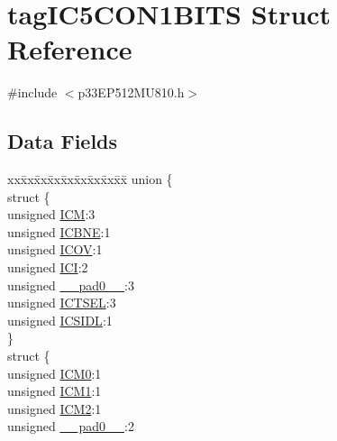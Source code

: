 \hypertarget{structtag_i_c5_c_o_n1_b_i_t_s}{}\section{tag\+I\+C5\+C\+O\+N1\+B\+I\+TS Struct Reference}
\label{structtag_i_c5_c_o_n1_b_i_t_s}


{\ttfamily \#include $<$p33\+E\+P512\+M\+U810.\+h$>$}

\subsection*{Data Fields}
\begin{DoxyCompactItemize}
\item 
\begin{tabbing}
xx\=xx\=xx\=xx\=xx\=xx\=xx\=xx\=xx\=\kill
union \{\\
\>struct \{\\
\>\>unsigned \hyperlink{structtag_i_c5_c_o_n1_b_i_t_s_ad3edde44ecb2d349ffa2decd0a251c20}{ICM}:3\\
\>\>unsigned \hyperlink{structtag_i_c5_c_o_n1_b_i_t_s_a824e7dcca83939e1b049d63ffcee33e9}{ICBNE}:1\\
\>\>unsigned \hyperlink{structtag_i_c5_c_o_n1_b_i_t_s_a49392949376ba0bf58cf8db889e86c94}{ICOV}:1\\
\>\>unsigned \hyperlink{structtag_i_c5_c_o_n1_b_i_t_s_a72486dcb868aad2d5c978494691356cc}{ICI}:2\\
\>\>unsigned \hyperlink{structtag_i_c5_c_o_n1_b_i_t_s_adf71f3d8410c1f1dbbc96680a92c49af}{\_\_pad0\_\_}:3\\
\>\>unsigned \hyperlink{structtag_i_c5_c_o_n1_b_i_t_s_a7a9dd41b5f93eb620df7fa336e452677}{ICTSEL}:3\\
\>\>unsigned \hyperlink{structtag_i_c5_c_o_n1_b_i_t_s_af441b36127c0bb7a35162dfc9a64103c}{ICSIDL}:1\\
\>\} \\
\>struct \{\\
\>\>unsigned \hyperlink{structtag_i_c5_c_o_n1_b_i_t_s_a649b1dd9bca75e558f37a9f52a829bd4}{ICM0}:1\\
\>\>unsigned \hyperlink{structtag_i_c5_c_o_n1_b_i_t_s_af3fe77ef9f8ca41ff11519f445e7bc77}{ICM1}:1\\
\>\>unsigned \hyperlink{structtag_i_c5_c_o_n1_b_i_t_s_a3c62c9cbbc3a406402126c932b709db8}{ICM2}:1\\
\>\>unsigned \hyperlink{structtag_i_c5_c_o_n1_b_i_t_s_adf71f3d8410c1f1dbbc96680a92c49af}{\_\_pad0\_\_}:2\\

\end{tabbing}
\end{DoxyCompactItemize}
